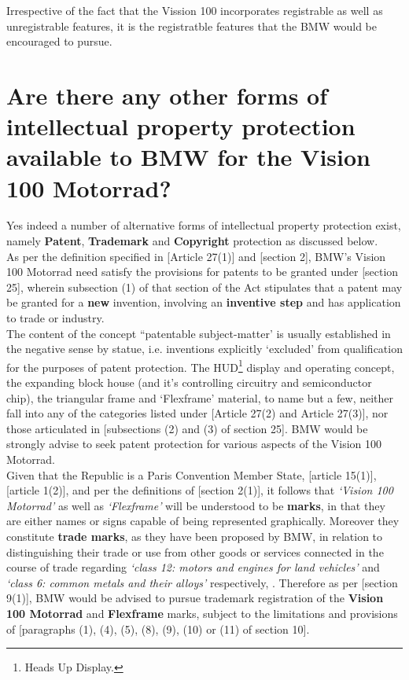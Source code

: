 \documentclass[11pt]{article}
\begin{document}
Irrespective of the fact that the Vission 100 incorporates registrable as well
as unregistrable features, it is the registratble features that the BMW would be
encouraged to pursue.

\section{Are there any other forms of intellectual property protection available to BMW for the Vision 100 Motorrad?}
\label{sec:orga652629}

Yes indeed a number of alternative forms of intellectual property protection
exist, namely \textbf{Patent}, \textbf{Trademark} and \textbf{Copyright} protection as discussed below.\\

As per the definition specified in [Article 27(1)]\cite{wto17_trips} and [section
2]\cite{rsa78_patents_act}, BMW's Vision 100 Motorrad need satisfy the provisions
for patents to be granted under [section 25]\cite{rsa78_patents_act}, wherein
subsection (1) of that section of the Act stipulates that a patent may be
granted for a \textbf{new} invention, involving an \textbf{inventive step} and has application
to trade or industry.\\

The content of the concept ``patentable subject-matter' is usually established
in the negative sense by statue, i.e. inventions explicitly `excluded' from
qualification for the purposes of patent protection. The HUD\footnote{Heads Up
Display.} display and operating concept, the expanding block house (and it's
controlling circuitry and semiconductor chip), the triangular frame and
`Flexframe' material, to name but a few, neither fall into any of the categories
listed under [Article 27(2) and Article 27(3)]\cite{wto17_trips}, nor
those articulated in [subsections (2) and (3) of section 25]\cite{rsa78_patents_act}. BMW
would be strongly advise to seek patent protection for various aspects of the
Vision 100 Motorrad.\\

Given that the Republic is a Paris Convention Member State, [article
15(1)]\cite{wto17_trips}, [article 1(2)]\cite{wipo83_paris_conve_protect_ip}, and
per the definitions of [section 2(1)]\cite{rsa93_tm_act}, it follows that \emph{`Vision
100 Motorrad'} as well as \emph{`Flexframe'} will be understood to be \textbf{marks}, in
that they are either names or signs capable of being represented graphically.
Moreover they constitute \textbf{trade marks}, as they have been proposed by BMW, in
relation to distinguishing their trade or use from other goods or services
connected in the course of trade regarding \emph{`class 12: motors and engines for
land vehicles'} and \emph{`class 6: common metals and their alloys'} respectively,
\cite{wipo57_ncl}. Therefore as per [section 9(1)]\cite{rsa93_tm_act}, BMW would be
advised to pursue trademark registration of the \textbf{Vision 100 Motorrad} and
\textbf{Flexframe} marks, subject to the limitations and provisions of [paragraphs (1),
(4), (5), (8), (9), (10) or (11) of section 10]\cite{rsa93_tm_act}.\\
\end{document}
